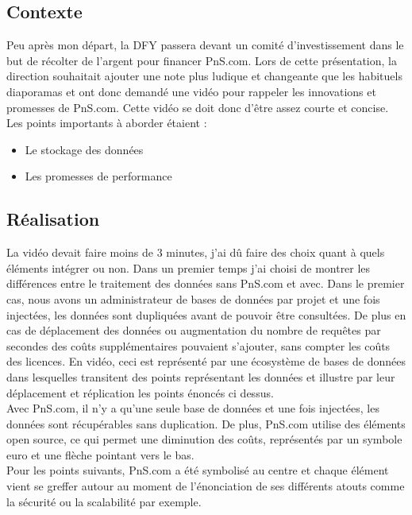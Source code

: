 \subsection{Contexte}
Peu après mon départ, la DFY passera devant un comité d'investissement dans le but de récolter de l'argent pour financer PnS.com. Lors de cette présentation, la direction souhaitait ajouter une note plus ludique et changeante que les habituels diaporamas et ont donc demandé une vidéo pour rappeler les innovations et promesses de PnS.com. Cette vidéo se doit donc d'être assez courte et concise. Les points importants à aborder étaient : 
\begin{itemize}
\item Le stockage des données
\item Les promesses de performance
\end{itemize}




\subsection{Réalisation}
La vidéo devait faire moins de 3 minutes, j'ai dû faire des choix quant à quels éléments intégrer ou non. Dans un premier temps j'ai choisi de montrer les différences entre le traitement des données sans PnS.com et avec. Dans le premier cas, nous avons un administrateur de bases de données par projet et une fois injectées, les données sont dupliquées avant de pouvoir être consultées. De plus en cas de déplacement des données ou augmentation du nombre de requêtes par secondes des coûts supplémentaires pouvaient s'ajouter, sans compter les coûts des licences. En vidéo, ceci est représenté par une écosystème de bases de données dans lesquelles transitent des points représentant les données et illustre par leur déplacement et réplication les points énoncés ci dessus.\\

Avec PnS.com, il n'y a qu'une seule base de données et une fois injectées, les données sont récupérables sans duplication. De plus, PnS.com utilise des éléments open source, ce qui permet une diminution des coûts, représentés par un symbole euro et une flèche pointant vers le bas.\\

Pour les points suivants, PnS.com a été symbolisé au centre et chaque élément vient se greffer autour au moment de l'énonciation de ses différents atouts comme la sécurité ou la scalabilité par exemple.


